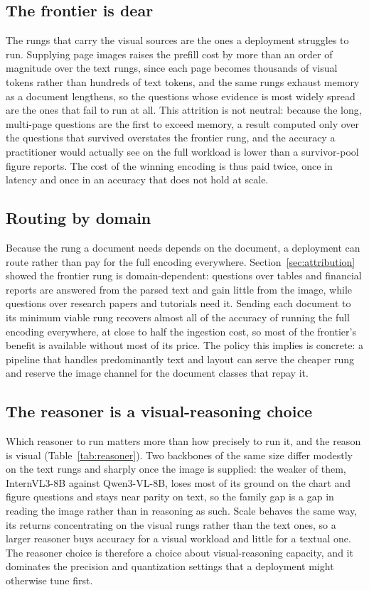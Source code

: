 \documentclass[11pt]{article}
\begin{document}
\subsection{The frontier is dear}
\label{subsec:dep_frontier}
The rungs that carry the visual sources are the ones a deployment struggles to run. Supplying page images raises the prefill cost by more than an order of magnitude over the text rungs, since each page becomes thousands of visual tokens rather than hundreds of text tokens, and the same rungs exhaust memory as a document lengthens, so the questions whose evidence is most widely spread are the ones that fail to run at all. This attrition is not neutral: because the long, multi-page questions are the first to exceed memory, a result computed only over the questions that survived overstates the frontier rung, and the accuracy a practitioner would actually see on the full workload is lower than a survivor-pool figure reports. The cost of the winning encoding is thus paid twice, once in latency and once in an accuracy that does not hold at scale.

\subsection{Routing by domain}
\label{subsec:dep_routing}
Because the rung a document needs depends on the document, a deployment can route rather than pay for the full encoding everywhere. Section~\ref{sec:attribution} showed the frontier rung is domain-dependent: questions over tables and financial reports are answered from the parsed text and gain little from the image, while questions over research papers and tutorials need it. Sending each document to its minimum viable rung recovers almost all of the accuracy of running the full encoding everywhere, at close to half the ingestion cost, so most of the frontier's benefit is available without most of its price. The policy this implies is concrete: a pipeline that handles predominantly text and layout can serve the cheaper rung and reserve the image channel for the document classes that repay it.

\subsection{The reasoner is a visual-reasoning choice}
\label{subsec:dep_reasoner}
Which reasoner to run matters more than how precisely to run it, and the reason is visual (Table~\ref{tab:reasoner}). Two backbones of the same size differ modestly on the text rungs and sharply once the image is supplied: the weaker of them, InternVL3-8B against Qwen3-VL-8B, loses most of its ground on the chart and figure questions and stays near parity on text, so the family gap is a gap in reading the image rather than in reasoning as such. Scale behaves the same way, its returns concentrating on the visual rungs rather than the text ones, so a larger reasoner buys accuracy for a visual workload and little for a textual one. The reasoner choice is therefore a choice about visual-reasoning capacity, and it dominates the precision and quantization settings that a deployment might otherwise tune first.
\end{document}
